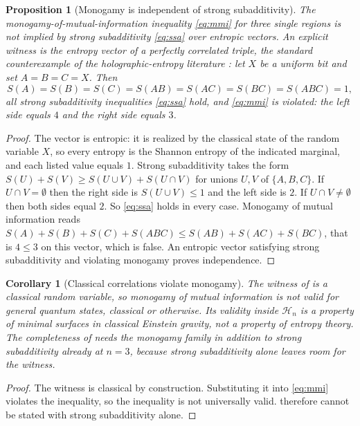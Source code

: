 \documentclass[11pt,letterpaper]{article}
\newtheorem{proposition}[theorem]{Proposition}
\newtheorem{corollary}[theorem]{Corollary}
\theoremstyle{definition}
\theoremstyle{remark}
\begin{document}
\begin{proposition}[Monogamy is independent of strong subadditivity]\label{prop:mmi}
The monogamy-of-mutual-information inequality \eqref{eq:mmi} for three single regions is not implied by strong subadditivity \eqref{eq:ssa} over entropic vectors. An explicit witness is the entropy vector of a perfectly correlated triple, the standard counterexample of the holographic-entropy literature \cite{hhm,baoetal}: let $X$ be a uniform bit and set $A = B = C = X$. Then
\[
S(A) = S(B) = S(C) = S(AB) = S(AC) = S(BC) = S(ABC) = 1,
\]
all strong subadditivity inequalities \eqref{eq:ssa} hold, and \eqref{eq:mmi} is violated: the left side equals $4$ and the right side equals $3$.
\end{proposition}

\begin{proof}
The vector is entropic: it is realized by the classical state of the random variable $X$, so every entropy is the Shannon entropy of the indicated marginal, and each listed value equals $1$. Strong subadditivity takes the form $S(U) + S(V) \ge S(U \cup V) + S(U \cap V)$ for unions $U, V$ of $\{A,B,C\}$. If $U \cap V = \emptyset$ then the right side is $S(U \cup V) \le 1$ and the left side is $2$. If $U \cap V \ne \emptyset$ then both sides equal $2$. So \eqref{eq:ssa} holds in every case. Monogamy of mutual information reads $S(A) + S(B) + S(C) + S(ABC) \le S(AB) + S(AC) + S(BC)$, that is $4 \le 3$ on this vector, which is false. An entropic vector satisfying strong subadditivity and violating monogamy proves independence.
\end{proof}

\begin{corollary}[Classical correlations violate monogamy]\label{cor:classicalmmi}
The witness of  is a classical random variable, so monogamy of mutual information is not valid for general quantum states, classical or otherwise. Its validity inside $\mathcal{H}_n$ is a property of minimal surfaces in classical Einstein gravity, not a property of entropy theory. The completeness of  needs the monogamy family in addition to strong subadditivity already at $n = 3$, because strong subadditivity alone leaves room for the witness.
\end{corollary}

\begin{proof}
The witness is classical by construction. Substituting it into \eqref{eq:mmi} violates the inequality, so the inequality is not universally valid.  therefore cannot be stated with strong subadditivity alone.
\end{proof}
\end{document}

